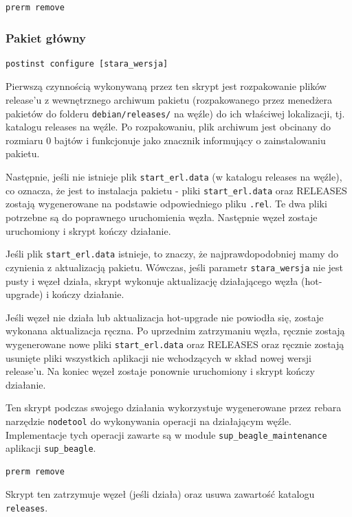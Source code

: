\documentclass[polish,12pt]{aghthesis}
\begin{document}
\begin{verbatim}
prerm remove
\end{verbatim}

\subsubsection{Pakiet główny}

\begin{verbatim}
postinst configure [stara_wersja]
\end{verbatim}

Pierwszą czynnością wykonywaną przez ten skrypt jest rozpakowanie plików release'u z wewnętrznego archiwum pakietu (rozpakowanego przez menedżera pakietów do folderu \texttt{debian/releases/} na węźle) do ich właściwej lokalizacji, tj. katalogu releases na węźle. Po rozpakowaniu, plik archiwum jest obcinany do rozmiaru 0 bajtów i funkcjonuje jako znacznik informujący o zainstalowaniu pakietu.

Następnie, jeśli nie istnieje plik \texttt{start\_erl.data} (w katalogu releases na węźle), co oznacza, że jest to instalacja pakietu - pliki \texttt{start\_erl.data} oraz RELEASES zostają wygenerowane na podstawie odpowiedniego pliku \texttt{.rel}. Te dwa pliki potrzebne są do poprawnego uruchomienia węzła. Następnie węzeł zostaje uruchomiony i skrypt kończy działanie.

Jeśli plik \texttt{start\_erl.data} istnieje, to znaczy, że najprawdopodobniej mamy do czynienia z aktualizacją pakietu. Wówczas, jeśli parametr \texttt{stara\_wersja} nie jest pusty i węzeł działa, skrypt wykonuje aktualizację działającego węzła (hot-upgrade) i kończy działanie.

Jeśli węzeł nie działa lub aktualizacja hot-upgrade nie powiodła się, zostaje wykonana aktualizacja ręczna. Po uprzednim zatrzymaniu węzła, ręcznie zostają wygenerowane nowe pliki \texttt{start\_erl.data} oraz RELEASES oraz ręcznie zostają usunięte pliki wszystkich aplikacji nie wchodzących w skład nowej wersji release'u. Na koniec węzeł zostaje ponownie uruchomiony i skrypt kończy działanie.

Ten skrypt podczas swojego działania wykorzystuje wygenerowane przez rebara narzędzie \texttt{nodetool} do wykonywania operacji na działającym węźle. Implementacje tych operacji zawarte są w module \texttt{sup\_beagle\_maintenance} aplikacji \texttt{sup\_beagle}.

\begin{verbatim}
prerm remove
\end{verbatim}

Skrypt ten zatrzymuje węzeł (jeśli działa) oraz usuwa zawartość katalogu \texttt{releases}.
\end{document}
